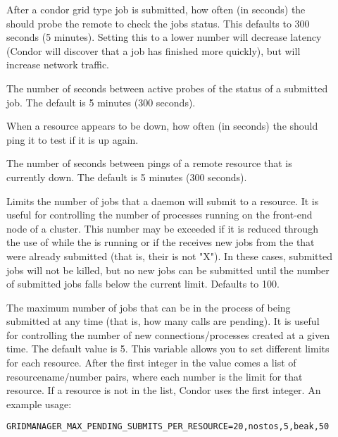 \begin{description}
\item[]
\label{param:CondorJobPollInterval}
After a condor grid type job is submitted, how often (in seconds) the 
should probe the remote  to check the jobs status.  
This defaults to 300 seconds (5 minutes).
Setting this to a lower number will decrease latency (Condor will discover
that a job has finished more quickly), but will increase network traffic.

\item[]
\label{param:GridmanagerJobProbeDelay} The number of seconds between
active probes of the status of a submitted job. The default is 5
minutes (300 seconds).

\item[]
\label{param:GridmanagerResourceProbeInterval}
When a resource appears to be down, how often (in seconds) the
should ping it to test if it is up again.

\item[]
\label{param:GridmanagerResourceProbeDelay} The number of seconds
between pings of a remote resource that is currently down. The default
is 5 minutes (300 seconds).

\item[]
\label{param:GridmanagerMaxSubmittedJobsPerResource}
Limits the number of jobs
that a  daemon will submit to a resource.
It is useful for controlling the number of 
processes running on the front-end node of a cluster.
This number may be exceeded if it is reduced through the use
of  while the  is running
or if the  receives new
jobs from the  that were already submitted
(that is, their  is not "X").
In these cases, submitted jobs will not be killed,
but no new jobs can be submitted until the number of submitted
jobs falls below the current limit.
Defaults to 100.

\item[]
\label{param:GridmanagerMaxPendingSubmitsPerResource} The maximum
number of jobs
that can be in the process of being submitted at any time (that is,
how many  calls are pending).
It is useful for controlling the number of new
connections/processes created at a given time.
The default value is 5.
This variable allows
you to set different limits for each resource.
After the first integer in the value
comes a list of resourcename/number pairs,
where each number is the limit for that resource.
If a resource is not in the list,
Condor uses the first integer.
An example usage:
\begin{verbatim}
GRIDMANAGER_MAX_PENDING_SUBMITS_PER_RESOURCE=20,nostos,5,beak,50
\end{verbatim}


\end{description}
